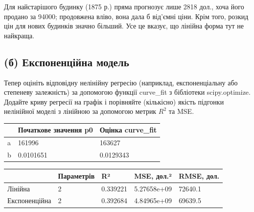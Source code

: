Для найстарішого будинку (1875 р.) пряма прогнозує лише 2818 дол., хоча
його продано за 94000; продовжена вліво, вона дала б від'ємні ціни. Крім
того, розкид цін для нових будинків значно більший. Усе це вказує, що
лінійна форма тут не найкраща.


\Needspace{199.0pt}

\subsection{(б) Експоненційна модель}

\begin{taskstatement}
Тепер оцініть відповідну нелінійну регресію (наприклад, експоненціальну
або степеневу залежність) за допомогою функції curve\_fit з бібліотеки
scipy.optimize. Додайте криву регресії на графік і порівняйте
(кількісно) якість підгонки нелінійної моделі з лінійною за допомогою
метрик \(R^2\) та MSE.
\end{taskstatement}



\begingroup\fontsize{7.5}{9.5}\selectfont\setlength{\tabcolsep}{2.5mm}\renewcommand{\arraystretch}{1.15}
\par\vspace{2pt}\noindent\begin{tabular}{|lll|}
\hline
 & Початкове значення p0 & Оцінка curve\_fit \\
\hline
a & 161996 & 163627 \\
b & 0.0101651 & 0.0129343 \\
\hline
\end{tabular}\par\vspace{2pt}
\endgroup


\Needspace{19.2pt}


\begingroup\fontsize{7.5}{9.5}\selectfont\setlength{\tabcolsep}{2.5mm}\renewcommand{\arraystretch}{1.15}
\par\vspace{2pt}\noindent\begin{tabular}{|lllll|}
\hline
 & Параметрів & R² & MSE, дол.² & RMSE, дол. \\
\hline
Лінійна & 2 & 0.339221 & 5.27658e+09 & 72640.1 \\
Експоненційна & 2 & 0.392684 & 4.84965e+09 & 69639.5 \\
\hline
\end{tabular}\par\vspace{2pt}
\endgroup


